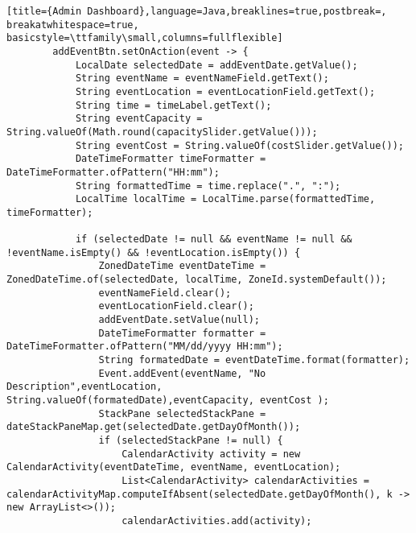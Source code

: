\begin{lstlisting}[title={Admin Dashboard},language=Java,breaklines=true,postbreak=, breakatwhitespace=true, basicstyle=\ttfamily\small,columns=fullflexible]
        addEventBtn.setOnAction(event -> {
            LocalDate selectedDate = addEventDate.getValue();
            String eventName = eventNameField.getText();
            String eventLocation = eventLocationField.getText();
            String time = timeLabel.getText();
            String eventCapacity = String.valueOf(Math.round(capacitySlider.getValue()));
            String eventCost = String.valueOf(costSlider.getValue());
            DateTimeFormatter timeFormatter = DateTimeFormatter.ofPattern("HH:mm");
            String formattedTime = time.replace(".", ":");
            LocalTime localTime = LocalTime.parse(formattedTime, timeFormatter);

            if (selectedDate != null && eventName != null && !eventName.isEmpty() && !eventLocation.isEmpty()) {
                ZonedDateTime eventDateTime = ZonedDateTime.of(selectedDate, localTime, ZoneId.systemDefault());
                eventNameField.clear();
                eventLocationField.clear();
                addEventDate.setValue(null);
                DateTimeFormatter formatter = DateTimeFormatter.ofPattern("MM/dd/yyyy HH:mm");
                String formatedDate = eventDateTime.format(formatter);
                Event.addEvent(eventName, "No Description",eventLocation, String.valueOf(formatedDate),eventCapacity, eventCost );
                StackPane selectedStackPane = dateStackPaneMap.get(selectedDate.getDayOfMonth());
                if (selectedStackPane != null) {
                    CalendarActivity activity = new CalendarActivity(eventDateTime, eventName, eventLocation);
                    List<CalendarActivity> calendarActivities = calendarActivityMap.computeIfAbsent(selectedDate.getDayOfMonth(), k -> new ArrayList<>());
                    calendarActivities.add(activity);


\end{lstlisting}
